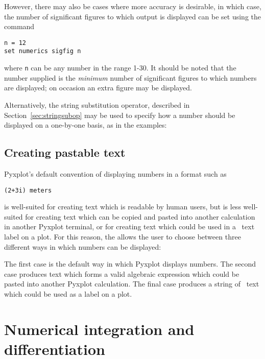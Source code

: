 However, there may also be cases where more accuracy is desirable, in which
case, the number of significant figures to which output is displayed can be set
using the command

\begin{verbatim}
n = 12
set numerics sigfig n
\end{verbatim}

\noindent where {\tt n} can be any number in the range 1-30. It should be noted
that the number supplied is the {\it minimum} number of significant figures to
which numbers are displayed; on occasion an extra figure may be displayed.

Alternatively, the string substitution operator, described in
Section~\ref{sec:stringsubop} may be used to specify how a number should be
displayed on a one-by-one basis, as in the examples:

\vspace{3mm}


\subsection{Creating pastable text}
\label{sec:pastable}

Pyxplot's default convention of displaying numbers in a format such as

\begin{verbatim}
(2+3i) meters
\end{verbatim}

\noindent is well-suited for creating text which is readable by human users, but
is less well-suited for creating text which can be copied and pasted into
another calculation in another Pyxplot terminal, or for creating text which
could be used in a \latexdcf\ text label on a plot. For this reason, the
 allows the user to choose between three
different ways in which numbers can be displayed:

\vspace{3mm}

\vspace{3mm}

The first case is the default way in which Pyxplot displays numbers. The second
case produces text which forms a valid algebraic expression which could be
pasted into another Pyxplot calculation. The final case produces a string of
\latexdcf\ text which could be used as a label on a plot.

\section{Numerical integration and differentiation}

